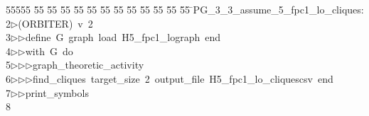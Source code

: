 %
%
\begin{tabbing}
55555 \= 55 \= 55 \= 55 \= 55 \= 55 \= 55 \= 55 \= 55 \= 55 \= 55 \= 55 \= 55 \= \>PG\_3\_3\_assume\_5\_fpc1\_lo\_cliques:\\[0pt]
2\>$\triangleright$\>(ORBITER)\ v\ 2\ \\[0pt]
3\>$\triangleright$\>$\triangleright$\>define\ G\ graph\ load\ H5\_fpc1\_lograph\ end\ \\[0pt]
4\>$\triangleright$\>$\triangleright$\>with\ G\ do\ \\[0pt]
5\>$\triangleright$\>$\triangleright$\>$\triangleright$\>graph\_theoretic\_activity\ \\[0pt]
6\>$\triangleright$\>$\triangleright$\>$\triangleright$\>find\_cliques\ target\_size\ 2\ output\_file\ H5\_fpc1\_lo\_cliquescsv\ end\ \\[0pt]
7\>$\triangleright$\>$\triangleright$\>print\_symbols\\[0pt]
8\>\end{tabbing}
